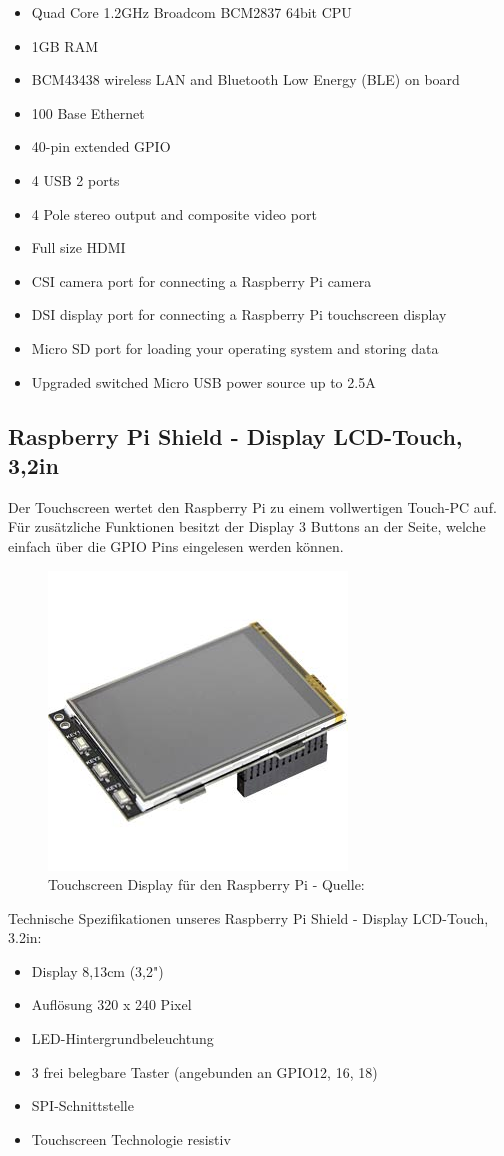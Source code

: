 \documentclass[a4paper,11pt,singlespacing]{article}
\begin{document}
				\begin{itemize}
					\item Quad Core 1.2GHz Broadcom BCM2837 64bit CPU
					\item 1GB RAM
					\item BCM43438 wireless LAN and Bluetooth Low Energy (BLE) on board
					\item 100 Base Ethernet
					\item 40-pin extended GPIO
					\item 4 USB 2 ports
					\item 4 Pole stereo output and composite video port
					\item Full size HDMI
					\item CSI camera port for connecting a Raspberry Pi camera
					\item DSI display port for connecting a Raspberry Pi touchscreen display
					\item Micro SD port for loading your operating system and storing data
					\item Upgraded switched Micro USB power source up to 2.5A
				\end{itemize}
			\subsection{Raspberry Pi Shield - Display LCD-Touch, 3,2in}
				Der Touchscreen wertet den Raspberry Pi zu einem vollwertigen Touch-PC auf. Für zusätzliche Funktionen besitzt der Display 3 Buttons an der Seite, welche einfach über die GPIO Pins eingelesen werden können.
				\begin{figure}[ht]
					\centering
					\includegraphics[scale=0.5]{touch_display}
					\caption{Touchscreen Display für den Raspberry Pi - Quelle: \cite{Picture_touchdisplay}}
					\label{touchdisplay}
				\end{figure}
				Technische Spezifikationen unseres Raspberry Pi Shield - Display LCD-Touch, 3.2in:
				\begin{itemize}
					\item Display 8,13cm (3,2")
					\item Auflösung 320 x 240 Pixel
					\item LED-Hintergrundbeleuchtung
					\item 3 frei belegbare Taster (angebunden an GPIO12, 16, 18)
					\item SPI-Schnittstelle
					\item Touchscreen Technologie resistiv
				\end{itemize}
\end{document}
